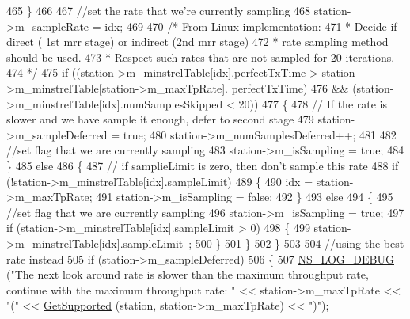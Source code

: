 \begin{DoxyCode}
465         \}
466 
467       \textcolor{comment}{//set the rate that we're currently sampling}
468       station->m\_sampleRate = idx;
469 
470       \textcolor{comment}{/* From Linux implementation:}
471 \textcolor{comment}{       * Decide if direct ( 1st mrr stage) or indirect (2nd mrr stage)}
472 \textcolor{comment}{       * rate sampling method should be used.}
473 \textcolor{comment}{       * Respect such rates that are not sampled for 20 iterations.}
474 \textcolor{comment}{       */}
475       \textcolor{keywordflow}{if} ((station->m\_minstrelTable[idx].perfectTxTime > station->m\_minstrelTable[station->m\_maxTpRate].
      perfectTxTime)
476           && (station->m\_minstrelTable[idx].numSamplesSkipped < 20))
477         \{
478           \textcolor{comment}{// If the rate is slower and we have sample it enough, defer to second stage}
479           station->m\_sampleDeferred = \textcolor{keyword}{true};
480           station->m\_numSamplesDeferred++;
481 
482           \textcolor{comment}{//set flag that we are currently sampling}
483           station->m\_isSampling = \textcolor{keyword}{true};
484         \}
485       \textcolor{keywordflow}{else}
486         \{
487           \textcolor{comment}{// if samplieLimit is zero, then don't sample this rate}
488           \textcolor{keywordflow}{if} (!station->m\_minstrelTable[idx].sampleLimit)
489             \{
490               idx =  station->m\_maxTpRate;
491               station->m\_isSampling = \textcolor{keyword}{false};
492             \}
493           \textcolor{keywordflow}{else}
494             \{
495               \textcolor{comment}{//set flag that we are currently sampling}
496               station->m\_isSampling = \textcolor{keyword}{true};
497               \textcolor{keywordflow}{if} (station->m\_minstrelTable[idx].sampleLimit > 0)
498                 \{
499                   station->m\_minstrelTable[idx].sampleLimit--;
500                 \}
501             \}
502         \}
503 
504       \textcolor{comment}{//using the best rate instead}
505       \textcolor{keywordflow}{if} (station->m\_sampleDeferred)
506         \{
507           \hyperlink{group__logging_ga413f1886406d49f59a6a0a89b77b4d0a}{NS\_LOG\_DEBUG} (\textcolor{stringliteral}{"The next look around rate is slower than the maximum throughput rate,
       continue with the maximum throughput rate: "} << station->m\_maxTpRate << \textcolor{stringliteral}{"("} << 
      \hyperlink{classns3_1_1WifiRemoteStationManager_a995c8bae0d84b168fd3e8bc9ecaacdd4}{GetSupported} (station, station->m\_maxTpRate) << \textcolor{stringliteral}{")"});

\end{DoxyCode}
